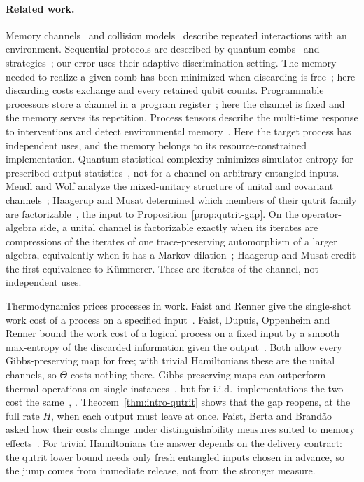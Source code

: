 \paragraph{Related work.}
Memory channels~\cite{KretschmannWerner2005,CarusoEtAl2014} and collision
models~\cite{CiccarelloEtAl2022} describe repeated interactions with an
environment. Sequential protocols are described by quantum
combs~\cite{ChiribellaDArianoPerinotti2009} and
strategies~\cite{GutoskiWatrous2007}; our error uses their adaptive
discrimination setting. The memory needed to realize a given comb has
been minimized when discarding is free~\cite{BisioEtAl2011,BisioEtAl2012};
here discarding costs exchange and every retained qubit counts.
Programmable processors store a channel in a program
register~\cite{NielsenChuang1997,HilleryZimanBuzek2002}; here the channel
is fixed and the memory serves its repetition. Process tensors describe
the multi-time response to interventions and detect environmental
memory~\cite{PollockEtAl2018}. Here the target process has independent
uses, and the memory belongs to its resource-constrained implementation.
Quantum statistical complexity minimizes simulator entropy for
prescribed output statistics~\cite{GuEtAl2012}, not for a channel on
arbitrary entangled inputs. Mendl and Wolf analyze the mixed-unitary
structure of unital and covariant channels~\cite{MendlWolf2009}; Haagerup
and Musat determined which members of their qutrit family are
factorizable~\cite[Corollary~5.7]{HaagerupMusat2015}, the input to
Proposition~\ref{prop:qutrit-gap}. On the operator-algebra side, a
unital channel is factorizable exactly when its iterates are
compressions of the iterates of one trace-preserving automorphism of a
larger algebra, equivalently when it has a Markov
dilation~\cite[Theorem~4.4]{HaagerupMusat2011}; Haagerup and Musat
credit the first equivalence to K\"ummerer. These are iterates of the
channel, not independent uses.

Thermodynamics prices processes in work. Faist and Renner give the
single-shot work cost of a process on a specified
input~\cite{FaistRenner2018}. Faist, Dupuis, Oppenheim and Renner bound
the work cost of a logical process on a fixed input by a smooth
max-entropy of the discarded information given the
output~\cite{FaistDupuisOppenheimRenner2015}. Both allow every
Gibbs-preserving map for free; with trivial Hamiltonians these are the
unital channels, so $\Theta$ costs nothing there. Gibbs-preserving maps
can outperform thermal operations on single
instances~\cite{FaistOppenheimRenner2015}, but for i.i.d.\
implementations the two cost the same~\cite{FaistBertaBrandao2019},
\cite[Theorem~7.1]{FaistBertaBrandao2021}.
Theorem~\ref{thm:intro-qutrit} shows that the gap reopens, at the full
rate $H$, when each output must leave at once. Faist, Berta and
Brand\~ao asked how their costs change under distinguishability measures
suited to memory effects~\cite{FaistBertaBrandao2019}. For trivial
Hamiltonians the answer depends on the delivery contract: the qutrit
lower bound needs only fresh entangled inputs chosen in advance, so the
jump comes from immediate release, not from the stronger measure.


